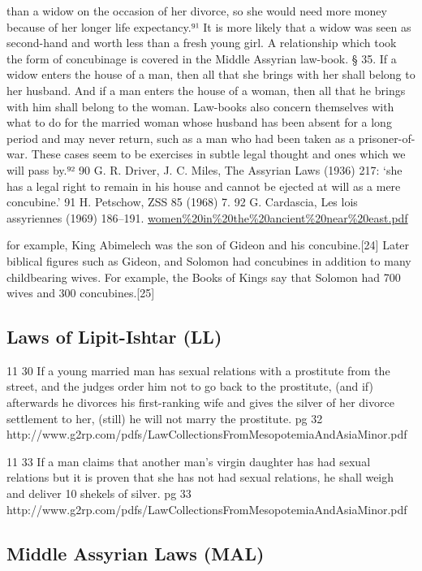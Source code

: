 \documentclass[11pt]{article}
\begin{document}
than a widow on the occasion of her divorce, so she would need more money
because of her longer life expectancy.⁹¹ It is more likely that a widow was seen
as second-hand and worth less than a fresh young girl.
A relationship which took the form of concubinage is covered in the Middle
Assyrian law-book.
§ 35. If a widow enters the house of a man, then all that she brings with her shall belong to
her husband. And if a man enters the house of a woman, then all that he brings with him
shall belong to the woman.
Law-books also concern themselves with what to do for the married woman
whose husband has been absent for a long period and may never return, such as
a man who had been taken as a prisoner-of-war. These cases seem to be exercises
in subtle legal thought and ones which we will pass by.⁹²
90 G. R. Driver, J. C. Miles, The Assyrian Laws (1936) 217: ‘she has a legal right to remain in his
house and cannot be ejected at will as a mere concubine.’
91 H. Petschow, ZSS 85 (1968) 7.
92 G. Cardascia, Les lois assyriennes (1969) 186–191.
\url{women\%20in\%20the\%20ancient\%20near\%20east.pdf}


for example, King Abimelech was the son of Gideon and his concubine.[24] Later biblical figures such as Gideon, and Solomon had concubines in addition to many childbearing wives. For example, the Books of Kings say that Solomon had 700 wives and 300 concubines.[25]


\subsection{Laws of Lipit-Ishtar (LL)}
11 30 If a young married man has
sexual relations with a prostitute
from the street, and the judges
order him not to go back to the
prostitute, (and if) afterwards he
divorces his first-ranking wife and
gives the silver of her divorce settlement to her, (still) he will not
marry the prostitute. 
pg 32
http://www.g2rp.com/pdfs/LawCollectionsFromMesopotemiaAndAsiaMinor.pdf

11 33 If a man claims that another
man's virgin daughter has had sexual relations but it is proven that
she has not had sexual relations, he
shall weigh and deliver 10 shekels
of silver. 
pg 33
http://www.g2rp.com/pdfs/LawCollectionsFromMesopotemiaAndAsiaMinor.pdf

\subsection{Middle Assyrian Laws (MAL) }
\end{document}
